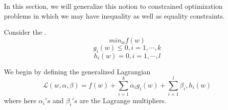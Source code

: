 \documentclass[12pt]{scrartcl}
\begin{document}
In this section, we will generalize this notion to constrained optimization problems in which we may have inequality as well as equality constraints. 
\begin{example}
    Consider the .
\[min_w f(w)\]
\[g_i(w) \leq 0, i = 1, \cdots, k\]
\[h_i(w) = 0, i = 1, \cdots, l\]

We begin by defining the generalized Lagrangian
\[\mathcal{L}(w, \alpha, \beta) = f(w) + \sum_{i=1}^k \alpha_ig_i(w) + \sum_{i=1}^l \beta_i, h_i(w)\]
where here $\alpha_i's$ and $\beta_i's$ are the Lagrange multipliers.
\end{example}








\end{document}
